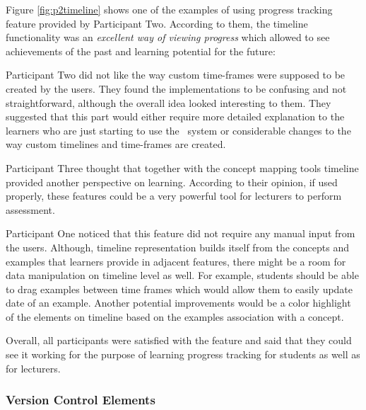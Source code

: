 Figure \ref{fig:p2timeline} shows one of the examples of using progress tracking
feature provided by Participant Two. According to them, the timeline
functionality was an \textit{excellent way of viewing progress} which allowed to
see achievements of the past and learning potential for the future:


Participant Two did not like the way custom time-frames were supposed to be
created by the users. They found the implementations to be confusing and not
straightforward, although the overall idea looked interesting to them. They
suggested that this part would either require more detailed explanation to the
learners who are just starting to use the \ep~system or considerable changes to
the way custom timelines and time-frames are created.

Participant Three thought that together with the concept mapping tools timeline
provided another perspective on learning. According to their opinion, if used
properly, these features could be a very powerful tool for lecturers to perform
assessment.


Participant One noticed that this feature did not require any manual input from
the users. Although, timeline representation builds itself from the concepts and
examples that learners provide in adjacent features, there might be a room for
data manipulation on timeline level as well. For example, students should be
able to drag examples between time frames which would allow them to easily
update date of an example. Another potential improvements would be a color
highlight of the elements on timeline based on the examples association with a
concept.

Overall, all participants were satisfied with the feature and said that they
could see it working for the purpose of learning progress tracking for students
as well as for lecturers.

\subsubsection{Version Control Elements}

